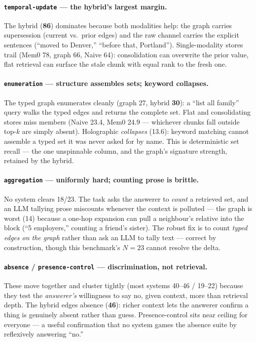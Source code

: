 \documentclass[11pt]{article}
\newcommand{\best}[1]{\textbf{#1}}
\begin{document}
\paragraph{\texttt{temporal-update} --- the hybrid's largest margin.}
The hybrid (\best{86}) dominates because both modalities help: the graph carries supersession (current vs.\
prior edges) and the raw channel carries the explicit sentences (``moved to Denver,'' ``before that,
Portland''). Single-modality stores trail (Mem0 78, graph 66, Naive 64): consolidation can overwrite the prior
value, flat retrieval can surface the stale chunk with equal rank to the fresh one.

\paragraph{\texttt{enumeration} --- structure assembles sets; keyword collapses.}
The typed graph enumerates cleanly (graph 27, hybrid \best{30}): a ``list all family'' query walks the typed
edges and returns the complete set. Flat and consolidating stores miss members (Naive 23.4, Mem0 24.9 ---
whichever chunks fall outside top-$k$ are simply absent). Holographic \emph{collapses} (13.6): keyword
matching cannot assemble a typed set it was never asked for by name. This is deterministic set recall --- the
one unspinnable column, and the graph's signature strength, retained by the hybrid.

\paragraph{\texttt{aggregation} --- uniformly hard; counting prose is brittle.}
No system clears 18/23. The task asks the answerer to \emph{count} a retrieved set, and an LLM tallying prose
miscounts whenever the context is polluted --- the graph is worst (14) because a one-hop expansion can pull a
neighbour's relative into the block (``5 employers,'' counting a friend's sister). The robust fix is to count
\emph{typed edges on the graph} rather than ask an LLM to tally text --- correct by construction, though this
benchmark's $N=23$ cannot resolve the delta.

\paragraph{\texttt{absence} / \texttt{presence-control} --- discrimination, not retrieval.}
These move together and cluster tightly (most systems 40--46 / 19--22) because they test the \emph{answerer's}
willingness to say no, given context, more than retrieval depth. The hybrid edges absence (\best{46}): richer
context lets the answerer confirm a thing is genuinely absent rather than guess. Presence-control sits near
ceiling for everyone --- a useful confirmation that no system games the absence suite by reflexively answering
``no.''
\end{document}
